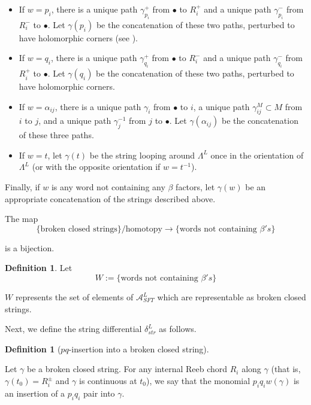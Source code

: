 \documentclass[a4paper,final, reqno]{amsart}
\theoremstyle{plain}
\theoremstyle{definition}
\newtheorem{Def}[Th]{Definition}
\newcommand{\A}{\mathcal{A}}
\begin{document}
	
	\begin{itemize}
		\item 	If $w=p_i$, there is a unique path $\gamma_{p_i}^+$ from $\bullet$ to $R_i^+$ and a unique path $\gamma_{p_i}^-$ from  $R_i^-$ to $\bullet$. Let $\gamma(p_i)$ be the concatenation of these two paths, perturbed to have holomorphic corners (see ).
		
		\item If $w=q_i$, there is a unique path $\gamma_{q_i}^+$ from $\bullet$ to $R_i^-$ and a unique path $\gamma_{q_i}^-$ from $R_i^+$ to $\bullet$. Let $\gamma(q_i)$ be the concatenation of these two paths, perturbed to have holomorphic corners.
		
		\item If $w=\alpha_{ij}$, there is a unique path $\gamma_i$ from $\bullet$ to $i$, a unique path $\gamma^M_{ij} \subset M$ from $i$ to $j$, and a unique path $\gamma_j^{-1}$ from $j$ to $\bullet$. Let $\gamma(\alpha_{ij})$ be the concatenation of these three paths.
		
		\item If $w = t$, let $\gamma(t)$ be the string looping around $\Lambda^L$ once in the orientation of $\Lambda^L$ (or with the opposite orientation if $w = t^{-1}$).
	\end{itemize}
	
	Finally, if $w$ is any word not containing any $\beta$ factors, let $\gamma(w)$ be an appropriate concatenation of the strings described above.
	
	
	The map 
	\[ \{ \text{broken closed strings}\} / \text{homotopy} \to \{ \text{words not containing } \beta's \}\]
	
	is a bijection. %
	
	
	
	\begin{Def}
		Let 
		\[ W:= \{\text{words not containing } \beta's \} \]
	\end{Def}
	
	$W$ represents the set of elements of $\A^L_{SFT}$ which are representable as broken closed strings.
	
	
	Next, we define the string differential $\delta_{str}^L$ as follows.
	
	\begin{Def}[$pq$-insertion into a broken closed string] \-\
		
		Let $\gamma$ be a broken closed string. For any internal Reeb chord $R_i$ along $\gamma$ (that is, $\gamma(t_0) = R_i^{\pm}$ and $\gamma$ is continuous at $t_0$), we say that the monomial $p_iq_i w(\gamma)$ is an insertion of a $p_iq_i$ pair into $\gamma$.
	\end{Def}
	
\end{document}
